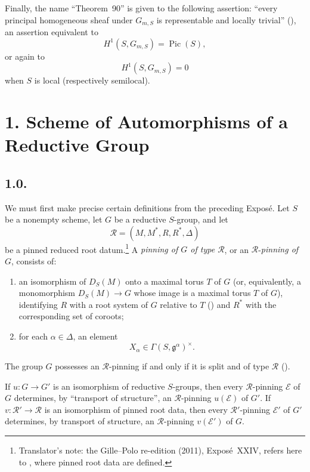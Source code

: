 Finally, the name ``Theorem~90'' is given to
the following assertion: ``every principal homogeneous sheaf under
\(G_{m,S}\) is representable and locally trivial''
\textup{()}, an assertion
equivalent to
\[
  H^1(S,G_{m,S})=\operatorname{Pic}(S),
\]
or again to
\[
  H^1(S,G_{m,S})=0
\]
when \(S\) is local \textup{(respectively semilocal)}.

\section*{1. Scheme of Automorphisms of a Reductive Group}

\subsection*{1.0.}
We must first make precise certain definitions from the preceding
Exposé. Let \(S\) be a nonempty scheme, let \(G\) be a reductive
\(S\)-group, and let
\[
  \mathscr R=(M,M^*,R,R^*,\Delta)
\]
be a pinned reduced root datum.\footnote{Translator's note: the Gille--Polo re-edition (2011), Exposé~XXIV, refers here
to , where pinned root data are defined.} A
\emph{pinning of \(G\) of type \(\mathscr R\)}, or an
\(\mathscr R\)-\emph{pinning of \(G\)}, consists of:
\begin{enumerate}
\item[(i)] an isomorphism of \(D_S(M)\) onto a maximal torus \(T\) of
  \(G\) \textup{(or, equivalently, a monomorphism
  \(D_S(M)\to G\) whose image is a maximal torus \(T\) of \(G\))},
  identifying \(R\) with a root system of \(G\) relative to \(T\)
  \textup{()} and \(R^*\) with the corresponding set of
  coroots;
\item[(ii)] for each \(\alpha\in\Delta\), an element
  \[
    X_\alpha\in\Gamma(S,\mathfrak g^\alpha)^\times.
  \]
\end{enumerate}
The group \(G\) possesses an \(\mathscr R\)-pinning if and only if it
is split and of type \(\mathscr R\) \textup{()}.

If \(u:G\to G'\) is an isomorphism of reductive \(S\)-groups, then
every \(\mathscr R\)-pinning \(\mathcal E\) of \(G\) determines, by
``transport of structure'', an \(\mathscr R\)-pinning
\(u(\mathcal E)\) of \(G'\). If
\(v:\mathscr R'\to\mathscr R\) is an isomorphism of pinned root data,
then every \(\mathscr R'\)-pinning \(\mathcal E'\) of \(G'\)
determines, by transport of structure, an \(\mathscr R\)-pinning
\(v(\mathcal E')\) of \(G\).

